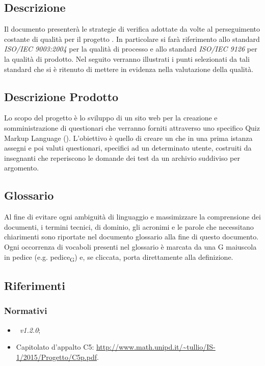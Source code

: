 \documentclass[12pt,a4paper]{article}
\begin{document}
\subsection{Descrizione}
Il documento presenterà  le strategie di verifica adottate da \nomeGruppo{} volte al
perseguimento costante di  qualità per il progetto \prjL{}.
In particolare si farà riferimento allo standard \textit{ISO/IEC 9003:2004} per la qualità di processo e allo standard \textit{ISO/IEC 9126} per la qualità di prodotto. Nel seguito verranno illustrati i punti selezionati da tali standard che si è ritenuto di mettere in evidenza nella valutazione della qualità.

\subsection{Descrizione Prodotto}
Lo scopo del progetto è lo sviluppo di un sito web per la creazione e somministrazione di questionari che verranno forniti attraverso uno specifico Quiz Markup Language (). L'obiettivo è quello di creare un  che in una prima istanza assegni e poi valuti questionari, specifici ad un determinato utente, costruiti da insegnanti che reperiscono le domande dei test da un archivio suddiviso per argomento.

\subsection{Glossario}
Al fine di evitare ogni ambiguità di linguaggio e massimizzare la comprensione dei documenti, i termini tecnici, di dominio, gli acronimi e le parole che necessitano chiarimenti sono riportate nel documento glossario alla fine di questo documento. Ogni occorrenza di vocaboli presenti nel glossario è marcata da una G maiuscola in pedice (e.g. pedice\textsubscript{G}) e, se cliccata, porta direttamente alla definizione.

\subsection{Riferimenti}

\subsubsection{Normativi}
\begin{itemize}
	\item \NdP\ \textit{v1.2.0};
	\item Capitolato d'appalto C5: \url{http://www.math.unipd.it/~tullio/IS-1/2015/Progetto/C5p.pdf}.
\end{itemize}
\end{document}
